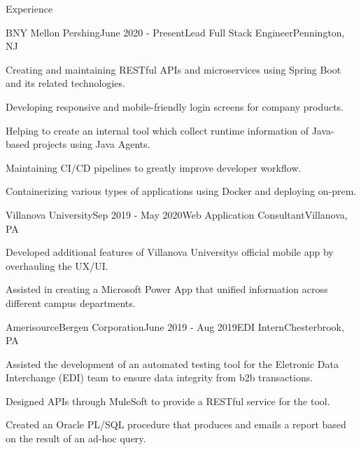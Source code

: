 \documentclass[
	11pt, %
]{resume} %
\begin{document}
\begin{rSection}{Experience}

	\begin{rSubsection}{BNY Mellon \textbar{} Pershing}{June 2020 - Present}{Lead Full Stack Engineer}{Pennington, NJ}
		\item Creating and maintaining RESTful APIs and microservices using Spring Boot and its related technologies.
		\item Developing responsive and mobile-friendly login screens for company products.
		\item Helping to create an internal tool which collect runtime information of Java-based projects using Java Agents.
		\item Maintaining CI/CD pipelines to greatly improve developer workflow.
		\item Containerizing various types of applications using Docker and deploying on-prem.
	\end{rSubsection}


	\begin{rSubsection}{Villanova University}{Sep 2019 - May 2020}{Web Application Consultant}{Villanova, PA}
		\item Developed additional features of Villanova University\textquotesingle{}s official mobile app by overhauling the UX/UI.
		\item Assisted in creating a Microsoft Power App that unified information across different campus departments.
	\end{rSubsection}


	\begin{rSubsection}{AmerisourceBergen Corporation}{June 2019 - Aug 2019}{EDI Intern}{Chesterbrook, PA}
		\item Assisted the development of an automated testing tool for the Eletronic Data Interchange (EDI) team to ensure data integrity from b2b transactions.
		\item Designed APIs through MuleSoft to provide a RESTful service for the tool.
		\item Created an Oracle PL/SQL procedure that produces and emails a report based on the result of an ad-hoc query.
	\end{rSubsection}


\end{rSection}
\end{document}
